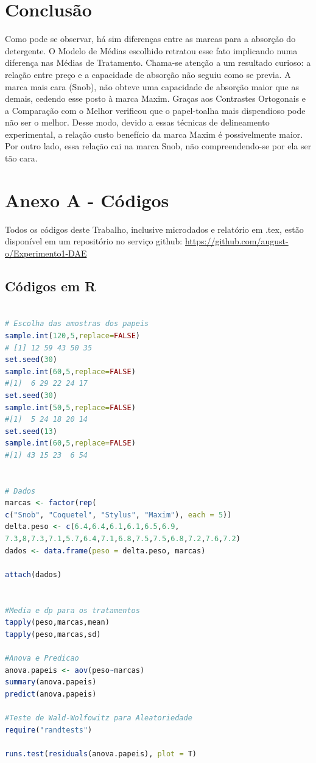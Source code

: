 \documentclass[a4paper,12pt,notitlepage]{article}
\begin{document}
\section{Conclusão}

Como pode se observar, há sim diferenças entre as marcas para a absorção do detergente. O Modelo de Médias escolhido retratou esse fato implicando numa diferença nas Médias de Tratamento. Chama-se atenção a um resultado curioso: a relação entre preço e a capacidade de absorção não seguiu como se previa. A marca mais cara (Snob), não obteve uma capacidade de absorção maior que as demais, cedendo esse posto à marca Maxim. Graças aos Contrastes Ortogonais e a Comparação com o Melhor verificou que o papel-toalha mais dispendioso pode não ser o melhor. Desse modo, devido a essas técnicas de delineamento experimental, a relação custo benefício da marca Maxim é possivelmente maior. Por outro lado, essa relação cai na marca Snob, não compreendendo-se por ela ser tão cara.

\nocite{kuehl1994statistical}
\nocite{kuehl2001diseno}
\nocite{kutner2003applied}
\nocite{lawson2010design}

\newpage

\section{Anexo A - Códigos}\label{anexo:A}

    Todos os códigos deste Trabalho, inclusive microdados e relatório em .tex, estão disponível em um repositório no serviço github: \url{https://github.com/august-o/Experimento1-DAE}

\subsection{Códigos em R}
\begin{lstlisting}[language=R]

# Escolha das amostras dos papeis
sample.int(120,5,replace=FALSE)
# [1] 12 59 43 50 35
set.seed(30)
sample.int(60,5,replace=FALSE)
#[1]  6 29 22 24 17
set.seed(30)
sample.int(50,5,replace=FALSE)
#[1]  5 24 18 20 14
set.seed(13)
sample.int(60,5,replace=FALSE)
#[1] 43 15 23  6 54


# Dados
marcas <- factor(rep(
c("Snob", "Coquetel", "Stylus", "Maxim"), each = 5))
delta.peso <- c(6.4,6.4,6.1,6.1,6.5,6.9,
7.3,8,7.3,7.1,5.7,6.4,7.1,6.8,7.5,7.5,6.8,7.2,7.6,7.2)
dados <- data.frame(peso = delta.peso, marcas)

attach(dados)


#Media e dp para os tratamentos
tapply(peso,marcas,mean)
tapply(peso,marcas,sd)

#Anova e Predicao
anova.papeis <- aov(peso~marcas)
summary(anova.papeis)
predict(anova.papeis)

#Teste de Wald-Wolfowitz para Aleatoriedade
require("randtests")

runs.test(residuals(anova.papeis), plot = T)
\end{lstlisting}
\end{document}
